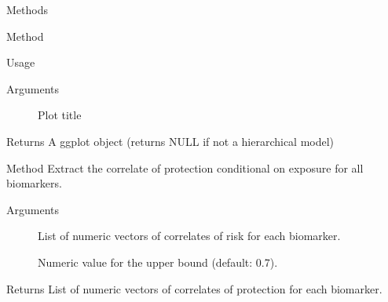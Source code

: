 \documentclass[a4paper]{book}
\begin{document}
\begin{Section}{Methods}
\begin{SubSection}{Method }
\begin{SubSubSection}{Usage}
\end{SubSubSection}


%
\begin{SubSubSection}{Arguments}

\begin{description}

\item[] Plot title

\end{description}


\end{SubSubSection}

%
\begin{SubSubSection}{Returns}
A ggplot object (returns NULL if not a hierarchical model)
\end{SubSubSection}

\end{SubSection}



\hypertarget{method-SeroCOPMulti-extract_cop_multi}{}
%
\begin{SubSection}{Method }
Extract the correlate of protection conditional on exposure for all biomarkers.
%


%
\begin{SubSubSection}{Arguments}

\begin{description}

\item[] List of numeric vectors of correlates of risk for each biomarker.

\item[] Numeric value for the upper bound (default: 0.7).

\end{description}


\end{SubSubSection}

%
\begin{SubSubSection}{Returns}
List of numeric vectors of correlates of protection for each biomarker.
\end{SubSubSection}


\end{SubSection}
\end{Section}
\end{document}
